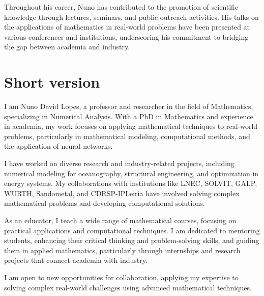 \documentclass[a4paper,11pt]{article}
\begin{document}
Throughout his career, Nuno has contributed to the promotion of scientific knowledge through lectures, seminars, and public outreach activities. His talks on the applications of mathematics in real-world problems have been presented at various conferences and institutions, underscoring his commitment to bridging the gap between academia and industry.

\section{Short version}

I am Nuno David Lopes, a professor and researcher in the field of Mathematics, specializing in Numerical Analysis. With a PhD in Mathematics and experience in academia, my work focuses on applying mathematical techniques to real-world problems, particularly in mathematical modeling, computational methods, and the application of neural networks.

I have worked on diverse research and industry-related projects, including numerical modeling for oceanography, structural engineering, and optimization in energy systems. My collaborations with institutions like LNEC, SOLVIT, GALP, WURTH, Sandometal, and CDRSP-IPLeiria have involved solving complex mathematical problems and developing computational solutions.

As an educator, I teach a wide range of mathematical courses, focusing on practical applications and computational techniques. I am dedicated to mentoring students, enhancing their critical thinking and problem-solving skills, and guiding them in applied mathematics, particularly through internships and research projects that connect academia with industry.

I am open to new opportunities for collaboration, applying my expertise to solving complex real-world challenges using advanced mathematical techniques.
\end{document}
